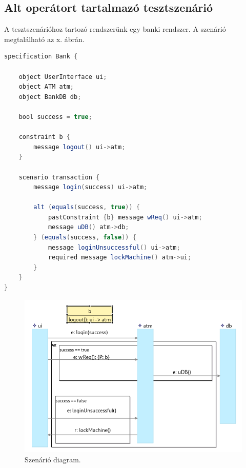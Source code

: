 \clearpage\subsection{Alt operátort tartalmazó tesztszenárió}

A tesztszenárióhoz tartozó rendszerünk egy banki rendszer.
A szenárió megtalálható az x. ábrán.

\begin{lstlisting}[language=java, frame=single, float=ht!, caption={Integrációs teszteset.},captionpos=b]
specification Bank {

    object UserInterface ui;
    object ATM atm;
    object BankDB db;

    bool success = true;

    constraint b {
        message logout() ui->atm;
    }

    scenario transaction {
        message login(success) ui->atm;

        alt (equals(success, true)) {
            pastConstraint {b} message wReq() ui->atm;
            message uDB() atm->db;
        } (equals(success, false)) {
            message loginUnsuccessful() ui->atm;
            required message lockMachine() atm->ui;
        }
    }
}
\end{lstlisting}

\begin{figure}[!ht]
    \centering
    \includegraphics[width=150mm, keepaspectratio]{figures/diagramAltExample.png}
    \caption{Szenárió diagram.}
\end{figure}

